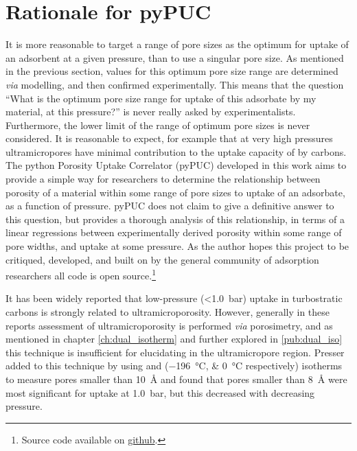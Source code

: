 \newpage
\section{Rationale for pyPUC}
It is more reasonable to target a range of pore sizes as the optimum for uptake of an \gls{adsorbent} at a given pressure, than to use a singular pore size. As mentioned in the previous section, values for this optimum pore size range are determined \textit{via} modelling, and then confirmed experimentally.\citep{Biloe2002Optimal, Cabria2007optimum, Hlushak2018Heat, Choi2019Unique, Presser2011Effect} This means that the question ``What is the optimum pore size range for uptake of this \gls{adsorbate} by my material, at this pressure?'' is never really asked by experimentalists. Furthermore, the lower limit of the range of optimum pore sizes is never considered. It is reasonable to expect, for example that at very high pressures \glspl{ultramicropore} have minimal contribution to the uptake capacity of  by carbons. The python Porosity Uptake Correlator (pyPUC) developed in this work aims to provide a simple way for researchers to determine the relationship between porosity of a material within some range of pore sizes to uptake of an \gls{adsorbate}, as a function of pressure. pyPUC does not claim to give a definitive answer to this question, but provides a thorough analysis of this relationship, in terms of a linear regressions between experimentally derived porosity within some range of pore widths, and uptake at some pressure. As the author hopes this project to be critiqued, developed, and built on by the general community of \gls{adsorption} researchers all code is open source.\footnote{Source code available on \href{https://github.com/sblanky/pyPUC}{github}.}

It has been widely reported that low-pressure (\qty{<1.0}{\bar})  uptake in \glspl{turbostratic carbon} is strongly related to ultramicroporosity.\citep{Presser2011Effect, Sevilla2013Assessment, Adeniran2016Is, Wickramaratne2013Importance} However, generally in these reports assessment of ultramicroporosity is performed \textit{via}  porosimetry, and as mentioned in chapter \ref{ch:dual_isotherm} and further explored in \ref{pub:dual_iso} this technique is insufficient for elucidating  in the \gls{ultramicropore} region.\citep{Jagiello2008Characterization, Jagiello2019Enhanced, Jagiello2020Exploiting} Presser added to this technique by using  and  (\qtylist[list-units=single]{-196;0}{\degreeCelsius} respectively) isotherms to measure pores smaller than \qty{10}{\angstrom} and found that pores smaller than \qty{8}{\angstrom} were most significant for  uptake at \qty{1.0}{\bar}, but this decreased with decreasing pressure.\citep{Presser2011Effect}

